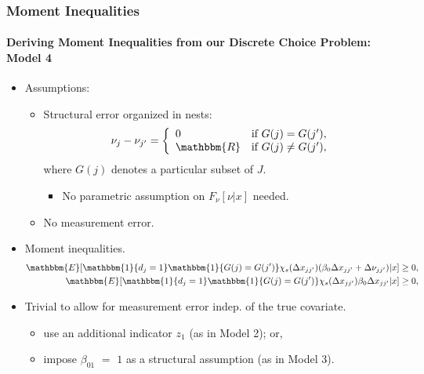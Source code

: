 \begin{frame}
\frametitle{Moment Inequalities}
\framesubtitle{Deriving Moment Inequalities from our Discrete Choice Problem: Model 4}

\begin{itemize}
	\item Assumptions:
	\begin{itemize}
		\item Structural error organized in nests:
		\begin{equation*}
		\nu_{j} - \nu_{j'} = \left\{
		\begin{array}{ll}
		0 & \text{if $G(j)=G(j')$},\\
		\mathbbm{R} & \text{if $G(j)\neq G(j')$},\\
		\end{array} \right.
		\end{equation*}
		where $G(j)$ denotes a particular subset of $J$.\\
		\begin{itemize}
			\item No parametric assumption on $F_{\nu}[\nu|x]$ needed.
		\end{itemize}
		\item No measurement error.
	\end{itemize}
	\item Moment inequalities.
	\begin{align*}
	\mathbbm{E}[\mathbbm{1}\{d_{j}=1\}\mathbbm{1}\{G(j)=G(j')\}\chi_{s}(\Delta x_{jj'})(\beta_{0}\Delta x_{jj'}+\Delta\nu_{jj'})|x]\geq 0,\\
	\mathbbm{E}[\mathbbm{1}\{d_{j}=1\}\mathbbm{1}\{G(j)=G(j')\}\chi_{s}(\Delta x_{jj'}) \beta_{0}\Delta x_{jj'}|x]\geq 0,
	\end{align*}
	\item Trivial to allow for measurement error indep. of the true covariate. 
	\begin{itemize}
		\item use an additional indicator $z_{1}$ (as in Model 2); or,
		\item impose $\beta_{01}$ $=$ $1$ as a structural assumption (as in Model 3).
	\end{itemize}
\end{itemize}
\end{frame}
